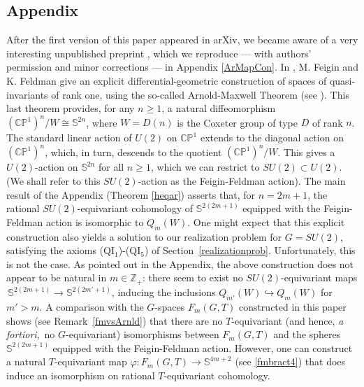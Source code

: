 \documentclass[11pt]{amsart}
\theoremstyle{definition}
\theoremstyle{remark}
\numberwithin{equation}{section}
\newcommand{\End}{\mathrm{End}}
\newcommand{\into}{\hookrightarrow}
\def\bS{\mathbb S}
\def\bP{\mathbb P}
\def\c{\mathbb{C}}
\def\Z{\mathbb{Z}}
\begin{document}
\subsection*{Appendix}
After the first version of this paper appeared in arXiv, we became aware of a very interesting
unpublished preprint \cite{FF}, which we reproduce ---  with authors' permission and minor corrections --- in Appendix \ref{ArMapCon}. In \cite{FF}, M. Feigin and K. Feldman give an explicit differential-geometric construction of spaces of quasi-invariants of rank one,  using the so-called Arnold-Maxwell Theorem (see \cite{Arnold1996}).   This last theorem provides, for any $ n \ge 1 $, a natural diffeomorphism $(\c\bP^1)^n\!/W \cong \bS^{2n}$, where $W = D(n) $ is the Coxeter group of type $D$ of rank $n$. The standard linear action of $U(2)$ on $\c\bP^1$ extends to the diagonal action on $(\c\bP^1)^n$, which, in turn, descends to the quotient $(\c\bP^1)^n/W$. This gives a $U(2)$-action on $\bS^{2n}$ for all $n\ge 1$, which we can restrict to $SU(2) \subset U(2) $. 
(We shall refer to this $SU(2)$-action as the Feigin-Feldman action). The main result of the Appendix (Theorem \ref{heqar}) asserts that, for $ n = 2m+1$, the rational $SU(2)$-equivariant cohomology of $\bS^{2(2m+1)}$ equipped with the Feigin-Feldman action is isomorphic to $Q_m(W)$. 
One might expect that this explicit construction also yields a solution to our
realization problem for $G =SU(2)$, satisfying the axioms (QI$_{1}$)-(QI$_{5}$) of Section~\ref{realizationprob}. 
Unfortunately, this is not the case. As pointed out in the Appendix, the above construction
does not appear to be natural in $m \in \Z_+$: there seem to exist no $SU(2)$-equivariant maps $\,\bS^{2(2m+1)} \to \bS^{2(2m' +1)} $, inducing the inclusions $ Q_{m'}(W) \into Q_{m}(W) $ for $ m' > m $. A comparison with the $G$-spaces $F_m(G,T)$ constructed in this paper shows (see Remark~\ref{fmvsArnld}) that there are no $T$-equivariant (and hence, {\it a fortiori}, \,no $G$-equivariant) isomorphisms between $F_m(G,T)$ and the spheres $\bS^{2(2m+1)}$ equipped with the Feigin-Feldman action. 
However, one can construct a natural $T$-equivariant map $ \varphi: F_m(G,T) \to \bS^{4m+2}$ 
(see \eqref{fmbract4}) that does induce an isomorphism on rational $T$-equivariant  cohomology. 
\end{document}
